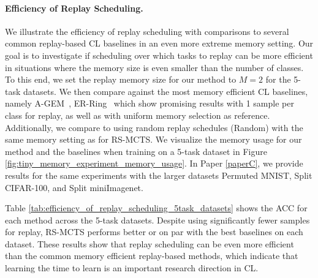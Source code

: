 \paragraph{Efficiency of Replay Scheduling.} We illustrate the efficiency of replay scheduling with comparisons to several common replay-based CL baselines in an even more extreme memory setting.
Our goal is to investigate if scheduling over which tasks to replay can be more efficient in situations where the memory size is even smaller than the number of classes. 
To this end, we set the replay memory size for our method
to $M=2$ for the 5-task datasets. We then compare against the most memory efficient CL baselines, namely A-GEM~\cite{chaudhry2018efficient}, ER-Ring~\cite{chaudhry2019tiny} which show promising results with 1 sample per class for replay, as well as with uniform memory selection as reference. 
Additionally, we compare to using random replay schedules (Random) with the same memory setting as for RS-MCTS.
We visualize the memory usage for our method and the baselines when training on a 5-task dataset in Figure \ref{fig:tiny_memory_experiment_memory_usage}. In Paper \ref{paperC}, we provide results for the same experiments with the larger datasets Permuted MNIST, Split CIFAR-100, and Split miniImagenet. 

Table \ref{tab:efficiency_of_replay_scheduling_5task_datasets} shows the ACC for each method across the 5-task datasets. Despite using significantly fewer samples for replay, RS-MCTS performs better or on par with the best baselines on each dataset. These results show that replay scheduling can be even more efficient than the common memory efficient replay-based methods, which indicate that learning the time to learn is an important research direction in CL.

